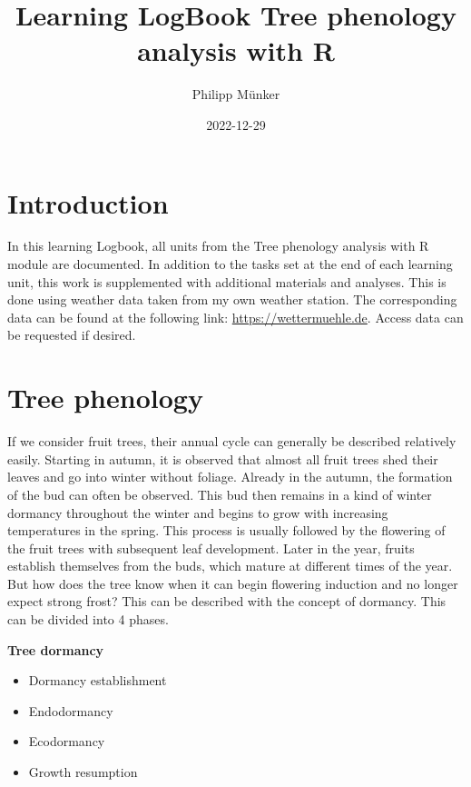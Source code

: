 \documentclass[
]{book}
\title{Learning LogBook Tree phenology analysis with R}
\author{Philipp Münker}
\date{2022-12-29}
\providecommand{\tightlist}{%
  \setlength{\itemsep}{0pt}\setlength{\parskip}{0pt}}
\begin{document}
\maketitle

{
\setcounter{tocdepth}{1}
\tableofcontents
}
\hypertarget{introduction}{%
\chapter{Introduction}\label{introduction}}

In this learning Logbook, all units from the Tree phenology analysis with R module are documented. In addition to the tasks set at the end of each learning unit, this work is supplemented with additional materials and analyses. This is done using weather data taken from my own weather station. The corresponding data can be found at the following link: \url{https://wettermuehle.de}. Access data can be requested if desired.

\hypertarget{tree-phenology}{%
\chapter{Tree phenology}\label{tree-phenology}}

If we consider fruit trees, their annual cycle can generally be described relatively easily. Starting in autumn, it is observed that almost all fruit trees shed their leaves and go into winter without foliage. Already in the autumn, the formation of the bud can often be observed. This bud then remains in a kind of winter dormancy throughout the winter and begins to grow with increasing temperatures in the spring. This process is usually followed by the flowering of the fruit trees with subsequent leaf development. Later in the year, fruits establish themselves from the buds, which mature at different times of the year.
But how does the tree know when it can begin flowering induction and no longer expect strong frost?
This can be described with the concept of dormancy. This can be divided into 4 phases.

\textbf{Tree dormancy}

\begin{itemize}
\tightlist
\item
  Dormancy establishment
\item
  Endodormancy
\item
  Ecodormancy
\item
  Growth resumption
\end{itemize}
\end{document}
